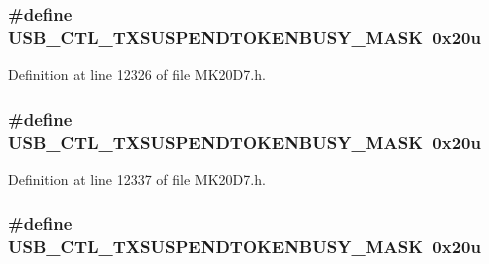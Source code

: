 \subsubsection[{\texorpdfstring{U\+S\+B\+\_\+\+C\+T\+L\+\_\+\+T\+X\+S\+U\+S\+P\+E\+N\+D\+T\+O\+K\+E\+N\+B\+U\+S\+Y\+\_\+\+M\+A\+SK}{USB_CTL_TXSUSPENDTOKENBUSY_MASK}}]{\setlength{\rightskip}{0pt plus 5cm}\#define U\+S\+B\+\_\+\+C\+T\+L\+\_\+\+T\+X\+S\+U\+S\+P\+E\+N\+D\+T\+O\+K\+E\+N\+B\+U\+S\+Y\+\_\+\+M\+A\+SK~0x20u}\hypertarget{group___u_s_b___register___masks_gaa2e78edccdce1268888d45bc4d81cfe1}{}\label{group___u_s_b___register___masks_gaa2e78edccdce1268888d45bc4d81cfe1}


Definition at line 12326 of file M\+K20\+D7.\+h.

\subsubsection[{\texorpdfstring{U\+S\+B\+\_\+\+C\+T\+L\+\_\+\+T\+X\+S\+U\+S\+P\+E\+N\+D\+T\+O\+K\+E\+N\+B\+U\+S\+Y\+\_\+\+M\+A\+SK}{USB_CTL_TXSUSPENDTOKENBUSY_MASK}}]{\setlength{\rightskip}{0pt plus 5cm}\#define U\+S\+B\+\_\+\+C\+T\+L\+\_\+\+T\+X\+S\+U\+S\+P\+E\+N\+D\+T\+O\+K\+E\+N\+B\+U\+S\+Y\+\_\+\+M\+A\+SK~0x20u}\hypertarget{group___u_s_b___register___masks_gaa2e78edccdce1268888d45bc4d81cfe1}{}\label{group___u_s_b___register___masks_gaa2e78edccdce1268888d45bc4d81cfe1}


Definition at line 12337 of file M\+K20\+D7.\+h.

\subsubsection[{\texorpdfstring{U\+S\+B\+\_\+\+C\+T\+L\+\_\+\+T\+X\+S\+U\+S\+P\+E\+N\+D\+T\+O\+K\+E\+N\+B\+U\+S\+Y\+\_\+\+M\+A\+SK}{USB_CTL_TXSUSPENDTOKENBUSY_MASK}}]{\setlength{\rightskip}{0pt plus 5cm}\#define U\+S\+B\+\_\+\+C\+T\+L\+\_\+\+T\+X\+S\+U\+S\+P\+E\+N\+D\+T\+O\+K\+E\+N\+B\+U\+S\+Y\+\_\+\+M\+A\+SK~0x20u}\hypertarget{group___u_s_b___register___masks_gaa2e78edccdce1268888d45bc4d81cfe1}{}\label{group___u_s_b___register___masks_gaa2e78edccdce1268888d45bc4d81cfe1}


